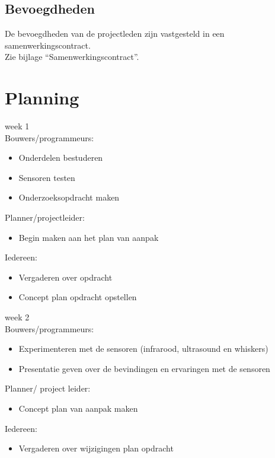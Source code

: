 \documentclass[oneside]{book}
\begin{document}
\section*{Bevoegdheden}
De bevoegdheden van de projectleden zijn vastgesteld in een samenwerkingscontract.\\
Zie bijlage “Samenwerkingscontract”.
\clearpage
\chapter{Planning}
week 1\\

Bouwers/programmeurs:\\
\begin{itemize}
\item Onderdelen bestuderen
\item Sensoren testen
\item Onderzoeksopdracht maken
\end{itemize}
	
Planner/projectleider:\\
\begin{itemize}
\item Begin maken aan het plan van aanpak
\end{itemize}

Iedereen:\\
\begin{itemize}
\item Vergaderen over opdracht
\item Concept plan opdracht opstellen
\end{itemize}

week 2\\
Bouwers/programmeurs:\\
\begin{itemize}
\item Experimenteren met de sensoren (infrarood, ultrasound en whiskers)
\item Presentatie geven over de bevindingen en ervaringen met de sensoren
\end{itemize}

Planner/ project leider:\\
\begin{itemize}
\item Concept plan van aanpak maken	
\end{itemize}

Iedereen:\\
\begin{itemize}
\item Vergaderen over wijzigingen plan opdracht
\end{itemize}
\end{document}
